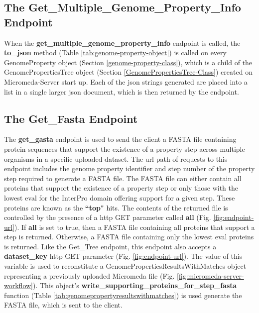 \subsection{The Get\_Multiple\_Genome\_Property\_Info Endpoint}

When the \textbf{get\_multiple\_genome\_property\_info} endpoint is called, the 
\textbf{to\_json} method (Table \ref{tab:genome-property-object}) is called on 
every GenomeProperty object (Section \ref{genome-property-class}), which is a 
child of the GenomePropertiesTree object (Section 
\ref{GenomePropertiesTree-Class}) created on Micromeda-Server start up. Each of 
the \gls{json} strings generated are placed into a list in a single larger 
\gls{json} document, which is then returned by the endpoint. 

\subsection{The Get\_Fasta Endpoint} \label{get-fasta-endpoint}

The \textbf{get\_gasta} endpoint is used to send the client a FASTA file 
containing protein sequences that support the existence of a property step 
across multiple organisms in a specific uploaded dataset. The \gls{url} path of 
requests to this endpoint includes the genome property identifier and step 
number of the property step required to generate a FASTA file. The FASTA file 
can either contain all proteins that support the existence of a property step or 
only those with the lowest \gls{eval} for the InterPro domain offering support 
for a given step. These proteins are known as the \textbf{``top"} hits. The 
contents of the returned file is controlled by the presence of a \gls{http} GET 
parameter called \textbf{all} (Fig. \ref{fig:endpoint-url}). If \textbf{all} is 
set to true, then a FASTA file containing all proteins that support a step is 
returned. Otherwise, a FASTA file containing only the lowest \gls{eval} proteins 
is returned. Like the Get\_Tree endpoint, this endpoint also accepts a 
\textbf{dataset\_key} \gls{http} GET parameter (Fig. \ref{fig:endpoint-url}). 
The value of this variable is used to reconstitute a 
GenomePropertiesResultsWithMatches object representing a previously uploaded 
Micromeda file (Fig. \ref{fig:micromeda-server-workflow}). This object's 
\textbf{write\_supporting\_proteins\_for\_step\_fasta} function (Table 
\ref{tab:genomepropertyresultswithmatches}) is used generate the FASTA file, 
which is sent to the client.

